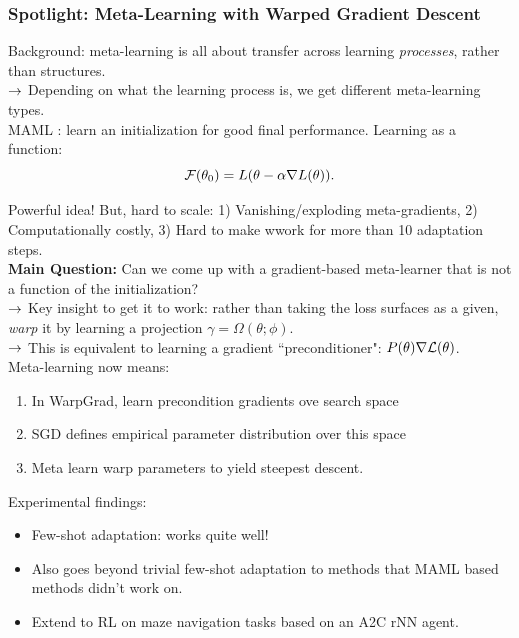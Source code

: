 

\subsubsection{Spotlight: Meta-Learning with Warped Gradient Descent}

Background: meta-learning is all about transfer across learning {\it processes}, rather than structures. \\

$\rightarrow$ Depending on what the learning process is, we get different meta-learning types. \\

MAML \cite{finn2017model}: learn an initialization for good final performance. Learning as a function:
\[
\mathcal{F}(\theta_0) = L(\theta - \alpha \nabla L(\theta)).
\]

Powerful idea! But, hard to scale: 1) Vanishing/exploding meta-gradients, 2) Computationally costly, 3) Hard to make wwork for more than 10 adaptation steps. \\

{\bf Main Question:} Can we come up with a gradient-based meta-learner that is not a function of the initialization? \\

$\rightarrow$ Key insight to get it to work: rather than taking the loss surfaces as a given, {\it warp} it by learning a projection $\gamma = \Omega(\theta;\phi)$. \\

$\rightarrow$ This is equivalent to learning a gradient ``preconditioner": $P(\theta) \nabla \mathcal{L}(\theta)$. \\

Meta-learning now means:
\begin{enumerate}
    \item In WarpGrad, learn precondition gradients ove search space
    \item SGD defines empirical parameter distribution over this space
    \item Meta learn warp parameters to yield steepest descent.
\end{enumerate}

Experimental findings:
\begin{itemize}
    \item Few-shot adaptation: works quite well!
    \item Also goes beyond trivial few-shot adaptation to methods that MAML based methods didn't work on.
    \item Extend to RL on maze navigation tasks based on an A2C rNN agent.
\end{itemize}

